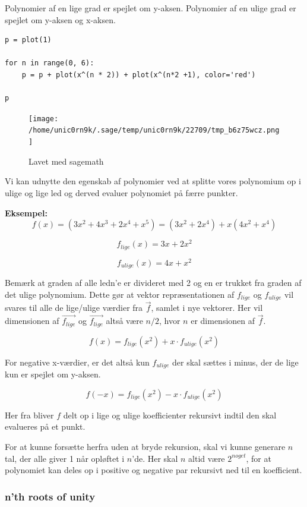 \documentclass[11pt,a4paper]{article}
\begin{document}
\newpage

Polynomier af en lige grad er spejlet om y-aksen.
Polynomier af en ulige grad er spejlet om y-aksen og x-aksen.

\begin{verbatim}
p = plot(1)

for n in range(0, 6):
    p = p + plot(x^(n * 2)) + plot(x^(n*2 +1), color='red')

p
\end{verbatim}

\begin{figure}[htbp]
\centering
\texttt{[image: /home/unic0rn9k/.sage/temp/unic0rn9k/22709/tmp\_b6z75wcz.png]}
\caption{Lavet med sagemath}
\end{figure}

Vi kan udnytte den egenskab af polynomier ved at splitte vores polynomium op i ulige og lige led
og derved evaluer polynomiet på færre punkter.

\bigskip

\textbf{Eksempel:}
$$
f(x) = (3x^2 + 4x^3 + 2x^4 + x^5) = (3x^2 + 2x^4) + x(4x^2 + x^4)
$$

$$
f_{lige}(x) = 3x + 2x^2
$$

$$
f_{ulige}(x) = 4x + x^2
$$

Bemærk at graden af alle ledn'e er divideret med 2 og en er trukket fra graden af det ulige polynomium.
Dette gør at vektor repræsentationen af \(f_{lige}\) og \(f_{ulige}\) vil svares til alle de lige/ulige værdier fra \(\vec{f}\),
samlet i nye vektorer. Her vil dimensionen af \({\vec{f_{lige}}}\) og \({\vec{f_{lige}}}\) altså være \(n/2\), hvor \(n\) er dimensionen af \(\vec{f}\).

$$
f(x) = f_{lige}(x^2) + x \cdot f_{ulige}(x^2)
$$

For negative x-værdier, er det altså kun \(f_{ulige}\) der skal sættes i minus,
der de lige kun er spejlet om y-aksen.

$$
f(-x) = f_{lige}(x^2) - x \cdot f_{ulige}(x^2)
$$

Her fra bliver \(f\) delt op i lige og ulige koefficienter rekursivt indtil den skal evalueres på et punkt.

For at kunne forsætte herfra uden at bryde rekursion, skal vi kunne generare \(n\) tal, der alle giver 1 når opløftet i \(n\)'de.
Her skal \(n\) altid være \(2^{noget}\), for at polynomiet kan deles op i positive og negative par rekursivt ned til en koefficient.

\bigskip

\subsubsection{n'th roots of unity}
\label{sec:orgf9f84a6}
\end{document}
